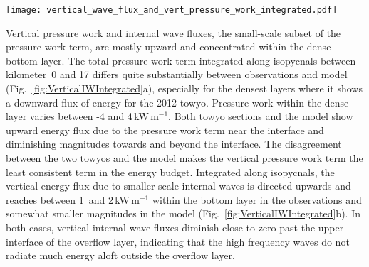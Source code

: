 \documentclass{ametsocV6.1}
\begin{document}
\begin{figure*}
\centerline{\texttt{[image: vertical\_wave\_flux\_and\_vert\_pressure\_work\_integrated.pdf]}}
\caption{
Vertical pressure work integrated horizontally along isopycnals (for towyo observations) and isotherms (for model output) between kilometer~0 and~17.
The dashed lines indicate the upper interface of the dense bottom layer at $\sigma_4=45.94$\,kg\,m$^{-3}$ in the observations and, correspondingly in the temperature-only stratified model, $\theta=0.9^{\circ}$C or $\theta=0.8^{\circ}$ (see text).
Vertical pressure work is shown for all scales in (a) and for lateral scales of less than 5\,km termed \emph{internal waves} in the text in (b).
Note the different x-axis limits between the two panels.
Model small-scale internal wave fluxes are calculated based on locally defined perturbation pressure and velocity (pink). 
For comparison, small-scale internal wave fluxes calculated based on high-pass filtered model velocity and pressure time series (see Appendix~B) are shown in orange. 
}
\label{fig:VerticalIWIntegrated}
\end{figure*}

Vertical pressure work and internal wave fluxes, the small-scale subset of the pressure work term, are mostly upward and concentrated within the dense bottom layer.
The total pressure work term integrated along isopycnals between kilometer~0 and 17 differs quite substantially between observations and model (Fig.~\ref{fig:VerticalIWIntegrated}a), especially for the densest layers where it shows a downward flux of energy for the 2012 towyo. 
Pressure work within the dense layer varies between -4 and 4\,kW\,m$^{-1}$. 
Both towyo sections and the model show upward energy flux due to the pressure work term near the interface and diminishing magnitudes towards and beyond the interface.
The disagreement between the two towyos and the model makes the vertical pressure work term the least consistent term in the energy budget.
Integrated along isopycnals, the vertical energy flux due to smaller-scale internal waves is directed upwards and reaches between 1~and 2\,kW\,m$^{-1}$ within the bottom layer in the observations and somewhat smaller magnitudes in the model (Fig.~\ref{fig:VerticalIWIntegrated}b).
In both cases, vertical internal wave fluxes diminish close to zero past the upper interface of the overflow layer, indicating that the high frequency waves do not radiate much energy aloft outside the overflow layer.
\end{document}
